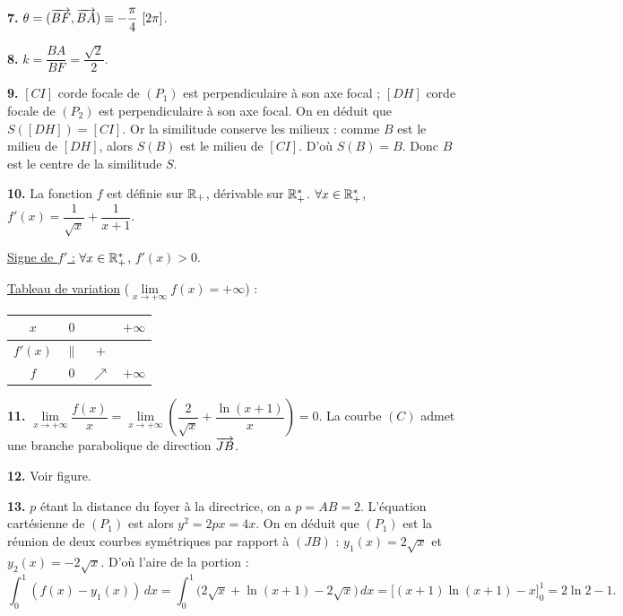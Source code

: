 \documentclass[11pt]{article}
\begin{document}
\textbf{7.} $\theta = (\overrightarrow{BF}, \overrightarrow{BA}) \equiv -\dfrac{\pi}{4}\ [2\pi]$.

\textbf{8.} $k = \dfrac{BA}{BF} = \dfrac{\sqrt{2}}{2}$.

\textbf{9.} $[CI]$ corde focale de $(P_1)$ est perpendiculaire à son axe focal ; $[DH]$ corde focale de $(P_2)$ est perpendiculaire à son axe focal. On en déduit que $S([DH]) = [CI]$. Or la similitude conserve les milieux : comme $B$ est le milieu de $[DH]$, alors $S(B)$ est le milieu de $[CI]$. D'où $S(B) = B$. Donc $B$ est le centre de la similitude $S$.

\textbf{10.} La fonction $f$ est définie sur $\mathbb{R}_+$, dérivable sur $\mathbb{R}_+^*$. $\forall x \in \mathbb{R}_+^*$, $f'(x) = \dfrac{1}{\sqrt{x}} + \dfrac{1}{x + 1}$.

\underline{Signe de $f'$ :} $\forall x \in \mathbb{R}_+^*$, $f'(x) > 0$.

\underline{Tableau de variation} ($\lim\limits_{x\to+\infty} f(x) = +\infty$) :
\begin{center}\renewcommand{\arraystretch}{1.4}
\begin{tabular}{|c|ccc|}
\hline
$x$ & $0$ & & $+\infty$ \\
\hline
$f'(x)$ & $\|$ & $+$ & \\
\hline
$f$ & $0$ & $\nearrow$ & $+\infty$ \\
\hline
\end{tabular}
\end{center}

\textbf{11.} $\lim\limits_{x\to+\infty}\dfrac{f(x)}{x} = \lim\limits_{x\to+\infty}\left(\dfrac{2}{\sqrt{x}} + \dfrac{\ln(x+1)}{x}\right) = 0$. La courbe $(C)$ admet une branche parabolique de direction $\overrightarrow{JB}$.

\textbf{12.} Voir figure.

\textbf{13.} $p$ étant la distance du foyer à la directrice, on a $p = AB = 2$. L'équation cartésienne de $(P_1)$ est alors $y^2 = 2px = 4x$. On en déduit que $(P_1)$ est la réunion de deux courbes symétriques par rapport à $(JB)$ : $y_1(x) = 2\sqrt{x}$ et $y_2(x) = -2\sqrt{x}$. D'où l'aire de la portion :
\[ \int_0^1 (f(x) - y_1(x))\,dx = \int_0^1 \big(2\sqrt{x} + \ln(x+1) - 2\sqrt{x}\big)\,dx = \big[(x+1)\ln(x+1) - x\big]_0^1 = 2\ln 2 - 1. \]
\end{document}
